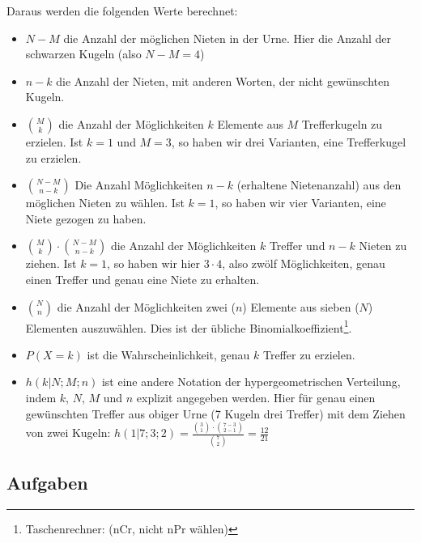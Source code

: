 Daraus werden die folgenden Werte berechnet:

\begin{itemize}
\item $N-M$ die Anzahl der möglichen Nieten in der Urne. Hier die Anzahl der schwarzen Kugeln (also $N-M = 4$)
\item $n-k$ die Anzahl der Nieten, mit anderen Worten, der nicht gewünschten Kugeln.
\item $M\choose k$ die Anzahl der Möglichkeiten $k$ Elemente aus $M$ Trefferkugeln zu erzielen. Ist \zB $k=1$ und $M=3$, so haben wir drei Varianten, eine Trefferkugel zu erzielen.
\item ${N-M}\choose {n-k}$ Die Anzahl Möglichkeiten $n-k$ (erhaltene Nietenanzahl) aus den möglichen Nieten zu wählen. Ist \zB $k=1$, so haben wir vier Varianten, eine Niete gezogen zu haben.
\item ${M\choose k} \cdot{} {{N-M}\choose {n-k}}$ die Anzahl der Möglichkeiten $k$ Treffer und $n-k$ Nieten zu ziehen. Ist \zB $k=1$, so haben wir hier $3\cdot{}4$, also zwölf Möglichkeiten, genau einen Treffer und genau eine Niete zu erhalten.
\item $N \choose n$ die Anzahl der Möglichkeiten zwei ($n$) Elemente
  aus sieben ($N$) Elementen auszuwählen. Dies ist der übliche
  Binomialkoeffizient\footnote{Taschenrechner:  (nCr, nicht nPr wählen)}.
\item $P(X=k)$ ist die Wahrscheinlichkeit, genau $k$ Treffer zu erzielen.
\item $h(k|N;M;n)$ ist eine andere Notation der hypergeometrischen Verteilung, indem $k$, $N$, $M$ und $n$ explizit angegeben werden. Hier \zB für genau einen gewünschten Treffer aus obiger Urne (7 Kugeln drei Treffer) mit dem Ziehen von zwei Kugeln: $h(1|7;3;2)=\frac{{3 \choose 1} \cdot{} {{7-3}\choose {2-1}  }   }{{ 7 \choose 2 }}=\frac{12}{21}$
\end{itemize}

\subsection*{Aufgaben}

\newpage

